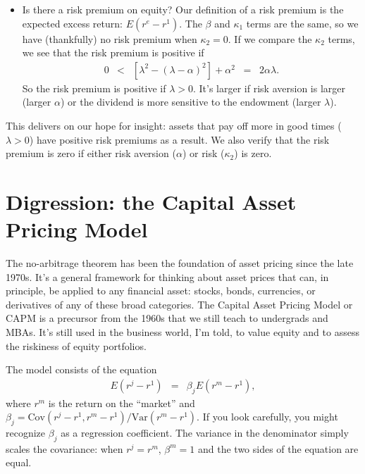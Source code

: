 \documentclass[11pt]{article}
\begin{document}
\begin{itemize}
\item Is there a risk premium on equity?
Our definition of a risk premium is the expected excess return:  $E(r^e-r^1)$.
The $\beta$ and $\kappa_1$ terms are the same, so we have (thankfully)
no risk premium when $\kappa_2 = 0$.
If we compare the $\kappa_2$ terms, we see that the risk premium is positive if
\begin{eqnarray*}
    0 &<& [\lambda^2 - (\lambda-\alpha)^2] + \alpha^2 \;\;=\;\; 2 \alpha \lambda .
\end{eqnarray*}
So the risk premium is positive if $\lambda > 0$.
It's larger if risk aversion is larger (larger $\alpha$)
or the dividend is more sensitive to the endowment (larger $\lambda$).
\end{itemize}
This delivers on our hope for insight:
assets that pay off more in good times ($\lambda>0$) have positive risk premiums as a result.
We also verify that the risk premium is  zero
if either risk aversion ($\alpha$) or risk ($\kappa_2$) is zero.


\section{Digression: the Capital Asset Pricing Model}

The no-arbitrage theorem has been the foundation of asset pricing since
the late 1970s.
It's a general framework for thinking about asset prices that can, in principle,
be applied to any financial asset:  stocks, bonds, currencies,
or derivatives of any of these broad categories.
The Capital Asset Pricing Model or CAPM is a precursor from the 1960s that
we still teach to undergrads and MBAs.
It's still used in the business world, I'm told,
to value equity and to assess the riskiness of equity portfolios.

\begin{comment}
On Sun, Oct 5, 2014 at 2:17 PM, David Backus <dbackus@stern.nyu.edu> wrote:
Does anyone in finance use it these days?

Okun:
Sure.  It is a used in firm valuation applications (M\&A, tax appraisal, private equity investing).  It is also useful in valuation of public equities (implied growth rate).

For connection to E(mr) = 1, see Cochrane Section 8.3.
\end{comment}

The model consists of the equation
\begin{eqnarray}
    E (r^j - r^1) &=& \beta_j E (r^m - r^1) ,
    \label{eq:capm}
\end{eqnarray}
where $r^m$ is the return on the ``market'' and
$\beta_j = \mbox{Cov}(r^j - r^1 , r^m - r^1)/ \mbox{Var}(r^m - r^1)$.
If you look carefully, you might recognize $\beta_j$ as a regression coefficient.
The variance in the denominator simply scales the covariance:
when $r^j = r^m$, $\beta^m = 1$ and the two sides of the equation are equal.
\end{document}

